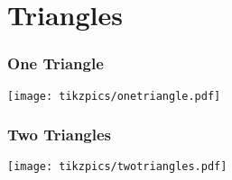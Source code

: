 \documentclass[../main.tex]{subfiles}
\begin{document}
\chapter{Triangles}

\subsection{One Triangle}

\texttt{[image: tikzpics/onetriangle.pdf]}

\subsection{Two Triangles}

\texttt{[image: tikzpics/twotriangles.pdf]}
\end{document}
